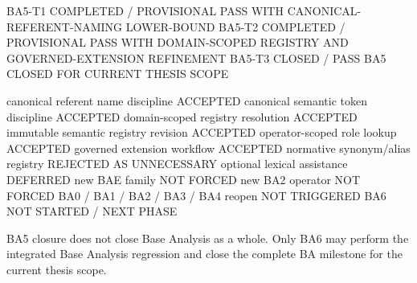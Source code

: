 \documentclass[
  10pt,
  a4paper,
]{article}
\newenvironment{Shaded}{}{}
\newcommand{\NormalTok}[1]{#1}
\begin{document}
\begin{Shaded}
\begin{Highlighting}[]
\NormalTok{BA5{-}T1    COMPLETED / PROVISIONAL PASS WITH CANONICAL{-}REFERENT{-}NAMING LOWER{-}BOUND}
\NormalTok{BA5{-}T2    COMPLETED / PROVISIONAL PASS WITH DOMAIN{-}SCOPED REGISTRY AND GOVERNED{-}EXTENSION REFINEMENT}
\NormalTok{BA5{-}T3    CLOSED / PASS}
\NormalTok{BA5       CLOSED FOR CURRENT THESIS SCOPE}

\NormalTok{canonical referent name discipline             ACCEPTED}
\NormalTok{canonical semantic token discipline             ACCEPTED}
\NormalTok{domain{-}scoped registry resolution               ACCEPTED}
\NormalTok{immutable semantic registry revision            ACCEPTED}
\NormalTok{operator{-}scoped role lookup                     ACCEPTED}
\NormalTok{governed extension workflow                     ACCEPTED}
\NormalTok{normative synonym/alias registry                REJECTED AS UNNECESSARY}
\NormalTok{optional lexical assistance                     DEFERRED}
\NormalTok{new BAE family                                  NOT FORCED}
\NormalTok{new BA2 operator                                NOT FORCED}
\NormalTok{BA0 / BA1 / BA2 / BA3 / BA4 reopen             NOT TRIGGERED}
\NormalTok{BA6                                             NOT STARTED / NEXT PHASE}
\end{Highlighting}
\end{Shaded}

BA5 closure does not close Base Analysis as a whole. Only BA6 may
perform the integrated Base Analysis regression and close the complete
BA milestone for the current thesis scope.
\end{document}
